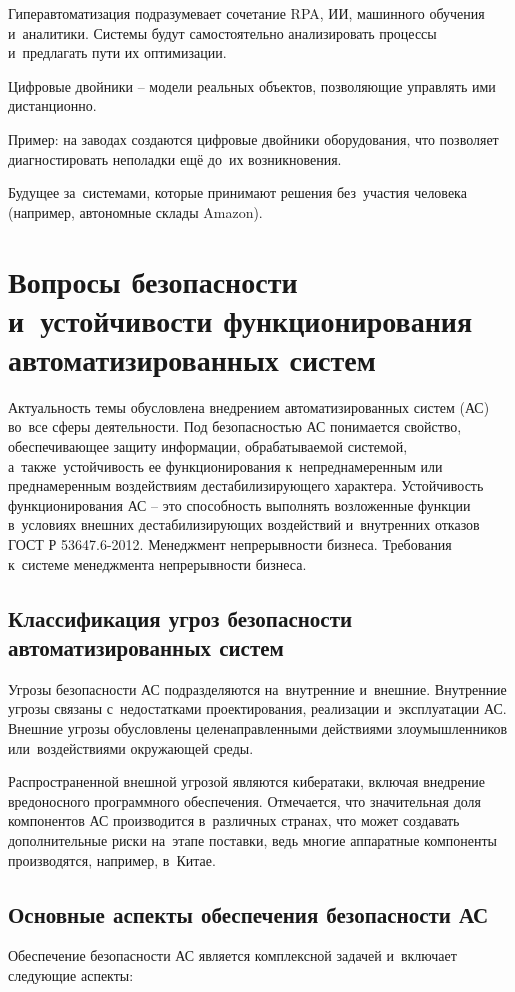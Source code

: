 \documentclass{ou}
\begin{document}
Гиперавтоматизация подразумевает сочетание RPA, ИИ, машинного обучения и~аналитики. Системы будут самостоятельно анализировать процессы и~предлагать пути их оптимизации.

Цифровые двойники -- модели реальных объектов, позволяющие управлять ими дистанционно.

Пример: на заводах создаются цифровые двойники оборудования, что позволяет диагностировать неполадки ещё до~их возникновения.

Будущее за~системами, которые принимают решения без~участия человека (например, автономные склады Amazon).
\newpage
\section{Вопросы безопасности и~устойчивости функционирования автоматизированных систем}
Актуальность темы обусловлена внедрением автоматизированных систем (АС) во~все сферы деятельности. Под безопасностью АС понимается свойство, обеспечивающее защиту информации, обрабатываемой системой, а~также~устойчивость ее функционирования к~непреднамеренным или преднамеренным воздействиям дестабилизирующего характера. Устойчивость функционирования АС -- это способность выполнять возложенные функции в~условиях внешних дестабилизирующих воздействий и~внутренних отказов ГОСТ Р 53647.6-2012. Менеджмент непрерывности бизнеса. Требования к~системе менеджмента непрерывности бизнеса.
\subsection{Классификация угроз безопасности автоматизированных систем}
Угрозы безопасности АС подразделяются на~внутренние и~внешние. Внутренние угрозы связаны с~недостатками проектирования, реализации и~эксплуатации АС. Внешние угрозы обусловлены целенаправленными действиями злоумышленников или~воздействиями окружающей среды.

Распространенной внешной угрозой являются кибератаки, включая внедрение вредоносного программного обеспечения. Отмечается, что значительная доля компонентов АС производится в~различных странах, что может создавать дополнительные риски на~этапе поставки, ведь многие аппаратные компоненты производятся, например, в~Китае.

\subsection{Основные аспекты обеспечения безопасности АС}
Обеспечение безопасности АС является комплексной задачей и~включает следующие аспекты:
\end{document}
